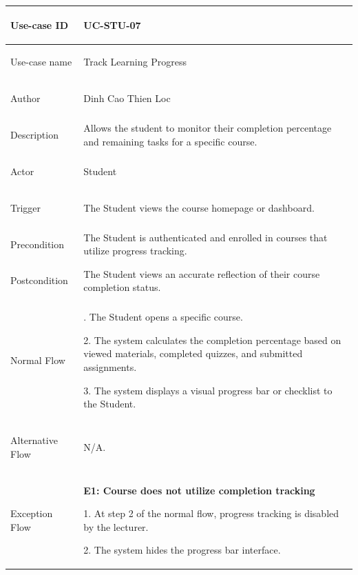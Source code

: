 {
\renewcommand{\arraystretch}{1.1}
\setlength{\tabcolsep}{8pt}
\begin{longtable}{|>{\bfseries\raggedright\arraybackslash}p{}|>{\raggedright\arraybackslash}p{}|}
\hline
Use-case ID & UC-STU-07 \\ \hline
Use-case name & Track Learning Progress \\ \hline
Author & Dinh Cao Thien Loc \\ \hline
Description & Allows the student to monitor their completion percentage and remaining tasks for a specific course. \\ \hline
Actor & Student \\ \hline
Trigger & The Student views the course homepage or dashboard. \\ \hline
Precondition & The Student is authenticated and enrolled in courses that utilize progress tracking. \\ \hline
Postcondition & The Student views an accurate reflection of their course completion status. \\ \hline
Normal Flow &
1. The Student opens a specific course. \par
2. The system calculates the completion percentage based on viewed materials, completed quizzes, and submitted assignments. \par
3. The system displays a visual progress bar or checklist to the Student. \\ \hline
Alternative Flow & N/A. \\ \hline
Exception Flow &
\textbf{E1: Course does not utilize completion tracking} \par
1. At step 2 of the normal flow, progress tracking is disabled by the lecturer. \par
2. The system hides the progress bar interface. \\ \hline
\end{longtable}
}

